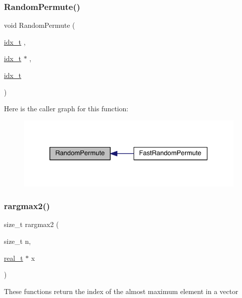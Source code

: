\subsubsection{\texorpdfstring{Random\+Permute()}{RandomPermute()}}
{\footnotesize\ttfamily void Random\+Permute (\begin{DoxyParamCaption}\item[{\hyperlink{a00876_aaa5262be3e700770163401acb0150f52}{idx\+\_\+t}}]{,  }\item[{\hyperlink{a00876_aaa5262be3e700770163401acb0150f52}{idx\+\_\+t} $\ast$}]{,  }\item[{\hyperlink{a00876_aaa5262be3e700770163401acb0150f52}{idx\+\_\+t}}]{ }\end{DoxyParamCaption})}

Here is the caller graph for this function\+:\nopagebreak
\begin{figure}[H]
\begin{center}
\leavevmode
\includegraphics[width=320pt]{a00951_a48483e0774d98abe224d43e75a208915_icgraph}
\end{center}
\end{figure}
\mbox{\label{a00951_af5fd829b43e17de0152d86c7a8780d6d}} 
\subsubsection{\texorpdfstring{rargmax2()}{rargmax2()}}
{\footnotesize\ttfamily size\+\_\+t rargmax2 (\begin{DoxyParamCaption}\item[{size\+\_\+t}]{n,  }\item[{\hyperlink{a00876_a1924a4f6907cc3833213aba1f07fcbe9}{real\+\_\+t} $\ast$}]{x }\end{DoxyParamCaption})}

These functions return the index of the almost maximum element in a vector \mbox{\label{a00951_ac5394e770bf9a444b47e90d6eead478a}} 
